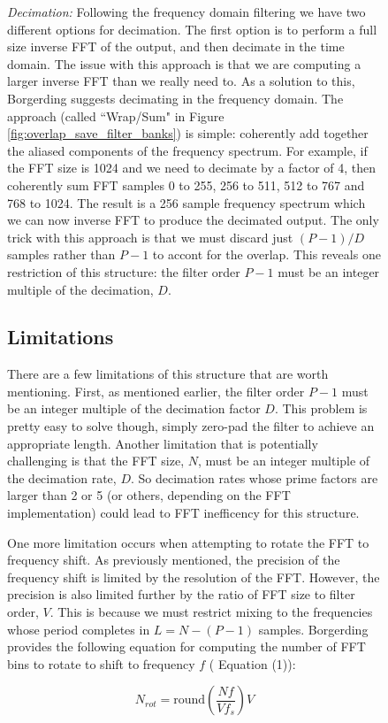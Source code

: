 \documentclass[12pt]{report}
\begin{document}
\begin{figure}[h!]
\emph{Decimation:} Following the frequency domain filtering we have two
different options for decimation. The first option is to perform a full size
inverse FFT of the output, and then decimate in the time domain. The issue with
this approach is that we are computing a larger inverse FFT than we really need
to. As a solution to this, Borgerding suggests decimating in the frequency
domain. The approach (called ``Wrap/Sum" in Figure
\ref{fig:overlap_save_filter_banks}) is simple: coherently add together the aliased
components of the frequency spectrum.  For example, if the FFT size is 1024 and
we need to decimate by a factor of 4, then coherently sum FFT samples 0 to 255,
256 to 511, 512 to 767 and 768 to 1024.  The result is a 256 sample frequency
spectrum which we can now inverse FFT to produce the decimated output. The only
trick with this approach is that we must discard just $(P-1)/D$ samples rather
than $P-1$ to accont for the overlap.  This reveals one restriction of this
structure: the filter order $P-1$ must be an integer multiple of the
decimation, $D$.

\subsection{Limitations}
\label{sec:os_limitations}
There are a few limitations of this structure that are worth mentioning. First,
as mentioned earlier, the filter order $P-1$ must be an integer multiple of the
decimation factor $D$. This problem is pretty easy to solve though, simply
zero-pad the filter to achieve an appropriate length. Another limitation that
is potentially challenging is that the FFT size, $N$, must be an integer
multiple of the decimation rate, $D$. So decimation rates whose prime factors
are larger than 2 or 5 (or others, depending on the FFT implementation) could
lead to FFT inefficency for this structure.

One more limitation occurs when attempting to rotate the FFT to frequency shift.
As previously mentioned, the precision of the frequency shift is limited by the
resolution of the FFT. However, the precision is also limited further by the
ratio of FFT size to filter order, $V$. This is because we must restrict mixing
to the frequencies whose period completes in $L=N-(P-1)$ samples. Borgerding
provides the following equation for computing the number of FFT bins to rotate
to shift to frequency $f$ (\cite{Borgerding1} Equation (1)):

\begin{equation*}
    N_{rot} = \text{round}\left( \frac{Nf}{Vf_s} \right) V
\end{equation*}


\end{figure}
\end{document}
